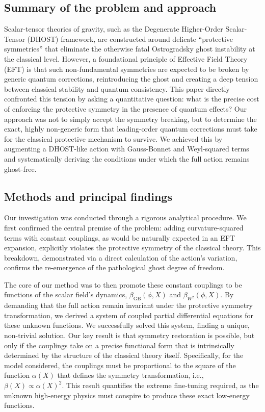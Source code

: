\documentclass[twocolumn]{aastex631}
\begin{document}
\subsection{Summary of the problem and approach}
Scalar-tensor theories of gravity, such as the Degenerate Higher-Order Scalar-Tensor (DHOST) framework, are constructed around delicate ``protective symmetries'' that eliminate the otherwise fatal Ostrogradsky ghost instability at the classical level. However, a foundational principle of Effective Field Theory (EFT) is that such non-fundamental symmetries are expected to be broken by generic quantum corrections, reintroducing the ghost and creating a deep tension between classical stability and quantum consistency. This paper directly confronted this tension by asking a quantitative question: what is the precise cost of enforcing the protective symmetry in the presence of quantum effects? Our approach was not to simply accept the symmetry breaking, but to determine the exact, highly non-generic form that leading-order quantum corrections must take for the classical protective mechanism to survive. We achieved this by augmenting a DHOST-like action with Gauss-Bonnet and Weyl-squared terms and systematically deriving the conditions under which the full action remains ghost-free.

\subsection{Methods and principal findings}
Our investigation was conducted through a rigorous analytical procedure. We first confirmed the central premise of the problem: adding curvature-squared terms with constant couplings, as would be naturally expected in an EFT expansion, explicitly violates the protective symmetry of the classical theory. This breakdown, demonstrated via a direct calculation of the action's variation, confirms the re-emergence of the pathological ghost degree of freedom.

The core of our method was to then promote these constant couplings to be functions of the scalar field's dynamics, $\beta_{\text{GB}}(\phi, X)$ and $\beta_{W^2}(\phi, X)$. By demanding that the full action remain invariant under the protective symmetry transformation, we derived a system of coupled partial differential equations for these unknown functions. We successfully solved this system, finding a unique, non-trivial solution. Our key result is that symmetry restoration is possible, but only if the couplings take on a precise functional form that is intrinsically determined by the structure of the classical theory itself. Specifically, for the model considered, the couplings must be proportional to the square of the function $\alpha(X)$ that defines the symmetry transformation, i.e., $\beta(X) \propto \alpha(X)^2$. This result quantifies the extreme fine-tuning required, as the unknown high-energy physics must conspire to produce these exact low-energy functions.
\end{document}
